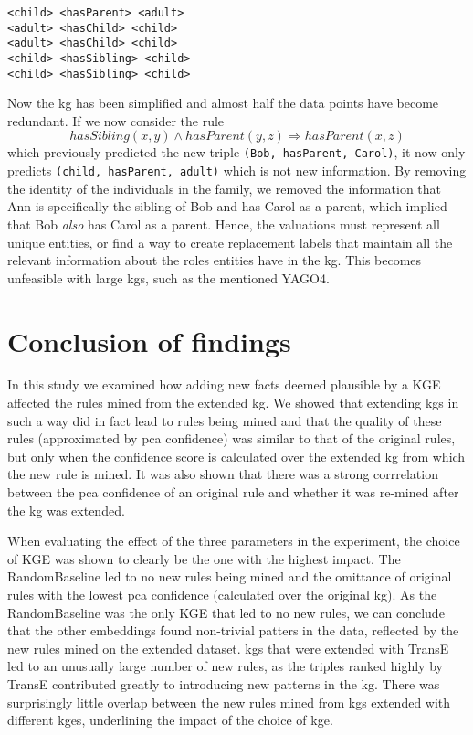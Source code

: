 \setcounter{example}{1}
\begin{example}
\begin{lstlisting}[]
<child> <hasParent> <adult>
<adult> <hasChild> <child>
<adult> <hasChild> <child>
<child> <hasSibling> <child>
<child> <hasSibling> <child>
\end{lstlisting}
\label{mini_simple_KG_rules}
\end{example}

Now the \gls{kg} has been simplified and almost half the data points have become redundant. If we now consider the rule \[hasSibling(x, y) \wedge hasParent(y,z) \Rightarrow hasParent(x,z)\] which previously predicted the new triple \texttt{(Bob, hasParent, Carol)}, it now only predicts \texttt{(child, hasParent, adult)} which is not new information. By removing the identity of the individuals in the family, we removed the information that Ann is specifically the sibling of Bob and has Carol as a parent, which implied that Bob \textit{also} has Carol as a parent. Hence, the valuations must represent all unique entities, or find a way to create replacement labels that maintain all the relevant information about the roles entities have in the \gls{kg}. This becomes unfeasible with large \glspl{kg}, such as the mentioned YAGO4.


\section{Conclusion of findings}
In this study we examined how adding new facts deemed plausible by a KGE affected the rules mined from the extended \gls{kg}. We showed that extending \glspl{kg} in such a way did in fact lead to rules being mined and that the quality of these rules (approximated by \gls{pca} confidence) was similar to that of the original rules, but only when the confidence score is calculated over the extended \gls{kg} from which the new rule is mined. It was also shown that there was a strong corrrelation between the \gls{pca} confidence of an original rule and whether it was re-mined after the \gls{kg} was extended.

When evaluating the effect of the three parameters in the experiment, the choice of KGE was shown to clearly be the one with the highest impact. The RandomBaseline led to no new rules being mined and the omittance of original rules with the lowest \gls{pca} confidence (calculated over the original \gls{kg}). As the RandomBaseline was the only KGE that led to no new rules, we can conclude that the other embeddings found non-trivial patters in the data, reflected by the new rules mined on the extended dataset. \glspl{kg} that were extended with TransE led to an unusually large number of new rules, as the triples ranked highly by TransE contributed greatly to introducing new patterns in the \gls{kg}. There was surprisingly little overlap between the new rules mined from \glspl{kg} extended with different \glspl{kge}, underlining the impact of the choice of \gls{kge}.

